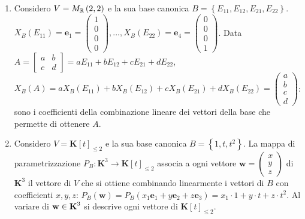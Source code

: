 \documentclass{article}
\begin{document}
\begin{enumerate}
\item Considero $V=M_{%
\mathbb{R}
}\left( 2,2\right) $ e la sua base canonica $B=\left\{
E_{11},E_{12},E_{21},E_{22}\right\} $. $X_{B}\left( E_{11}\right) =\mathbf{e}%
_{1}=\left( 
\begin{array}{c}
1 \\ 
0 \\ 
0 \\ 
0%
\end{array}%
\right) ,...,X_{B}\left( E_{22}\right) =\mathbf{e}_{4}=\left( 
\begin{array}{c}
0 \\ 
0 \\ 
0 \\ 
1%
\end{array}%
\right) $. Data $A=\left[ 
\begin{array}{cc}
a & b \\ 
c & d%
\end{array}%
\right] =aE_{11}+bE_{12}+cE_{21}+dE_{22}$, $X_{B}\left( A\right)
=aX_{B}\left( E_{11}\right) +bX_{B}\left( E_{12}\right) +cX_{B}\left(
E_{21}\right) +dX_{B}\left( E_{22}\right) =\left( 
\begin{array}{c}
a \\ 
b \\ 
c \\ 
d%
\end{array}%
\right) $: sono i coefficienti della combinazione lineare dei vettori della
base che permette di ottenere $A$.

\item Considero $V=\mathbf{K}\left[ t\right] _{\leq 2}$ e la sua base
canonica $B=\left\{ 1,t,t^{2}\right\} $. La mappa di parametrizzazione $%
P_{B}:\mathbf{K}^{3}\rightarrow \mathbf{K}\left[ t\right] _{\leq 2}$ associa
a ogni vettore $\mathbf{w=}\left( 
\begin{array}{c}
x \\ 
y \\ 
z%
\end{array}%
\right) $ di $\mathbf{K}^{3}$ il vettore di $V$ che si ottiene combinando
linearmente i vettori di $B$ con coefficienti $x,y,z$: $P_{B}\left( \mathbf{w%
}\right) =P_{B}\left( x_{1}\mathbf{e}_{1}+y\mathbf{e}_{2}+z\mathbf{e}%
_{3}\right) =x_{1}\cdot 1+y\cdot t+z\cdot t^{2}$. Al variare di $\mathbf{%
w\in K}^{3}$ si descrive ogni vettore di $\mathbf{K}\left[ t\right] _{\leq
2} $.
\end{enumerate}
\end{document}
